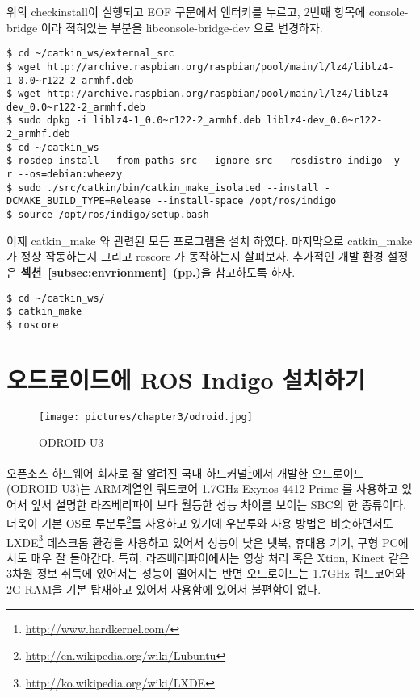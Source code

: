 위의 checkinstall이 실행되고 EOF 구문에서 엔터키를 누르고, 2번째 항목에 console-bridge 이라 적혀있는 부분을 libconsole-bridge-dev 으로 변경하자.

\vspace{\baselineskip}
\begin{lstlisting}[language=ROS]
$ cd ~/catkin_ws/external_src
$ wget http://archive.raspbian.org/raspbian/pool/main/l/lz4/liblz4-1_0.0~r122-2_armhf.deb
$ wget http://archive.raspbian.org/raspbian/pool/main/l/lz4/liblz4-dev_0.0~r122-2_armhf.deb
$ sudo dpkg -i liblz4-1_0.0~r122-2_armhf.deb liblz4-dev_0.0~r122-2_armhf.deb
$ cd ~/catkin_ws
$ rosdep install --from-paths src --ignore-src --rosdistro indigo -y -r --os=debian:wheezy
$ sudo ./src/catkin/bin/catkin_make_isolated --install -DCMAKE_BUILD_TYPE=Release --install-space /opt/ros/indigo
$ source /opt/ros/indigo/setup.bash
\end{lstlisting}

이제 catkin\_make 와 관련된 모든 프로그램을 설치 하였다. 마지막으로 catkin\_make 가 정상 작동하는지 그리고 roscore 가 동작하는지 살펴보자. 추가적인 개발 환경 설정은 \textbf{섹션~\ref{subsec:envrionment}~(pp.\pageref{subsec:envrionment})}을 참고하도록 하자.

\vspace{\baselineskip}
\begin{lstlisting}[language=ROS]
$ cd ~/catkin_ws/
$ catkin_make
$ roscore
\end{lstlisting}

\newpage
\section{오드로이드에 ROS Indigo 설치하기}

\begin{figure}[h]
\centering\texttt{[image: pictures/chapter3/odroid.jpg]}
\caption{ODROID-U3}
\end{figure}

오픈소스 하드웨어 회사로 잘 알려진 국내 하드커널\footnote{\url{http://www.hardkernel.com/}}에서 개발한 오드로이드(ODROID-U3)는 ARM계열인 쿼드코어 1.7GHz Exynos 4412 Prime 를 사용하고 있어서 앞서 설명한 라즈베리파이 보다 월등한 성능 차이를 보이는 SBC의 한 종류이다. 더욱이 기본 OS로 루분투\footnote{\url{http://en.wikipedia.org/wiki/Lubuntu}}를 사용하고 있기에 우분투와 사용 방법은 비슷하면서도 LXDE\footnote{\url{http://ko.wikipedia.org/wiki/LXDE}} 데스크톱 환경을 사용하고 있어서 성능이 낮은 넷북, 휴대용 기기, 구형 PC에서도 매우 잘 돌아간다. 특히, 라즈베리파이에서는 영상 처리 혹은 Xtion, Kinect 같은 3차원 정보 취득에 있어서는 성능이 떨어지는 반면 오드로이드는 1.7GHz 쿼드코어와 2G RAM을 기본 탑재하고 있어서 사용함에 있어서 불편함이 없다.

